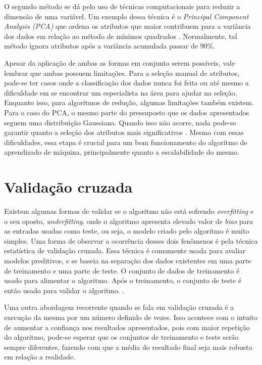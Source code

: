O segundo método se dá pelo uso de técnicas computacionais para reduzir a
dimensão de uma variável. Um exemplo dessa técnica é o \textit{Principal
Component Analysis (PCA) } que ordena os atributos que maior contribuem para a
variância dos dados em relação ao método de mínimos quadrados
\cite{amatriain2011data}. Normalmente, tal método ignora atributos após a
variância acumulada passar de 90\%.

Apesar da aplicação de ambas as formas em conjunto serem possíveis, vale lembrar
que ambas possuem limitações. Para a seleção manual de atributos, pode-se ter
casos onde a classificação dos dados nunca foi feita ou até mesmo a dificuldade
em se encontrar um especialista na área para ajudar na seleção. Enquanto isso,
para algoritmos de redução, algumas limitações também existem. Para o caso do
PCA, o mesmo parte do pressuposto que os dados apresentados seguem uma
distribuição Gaussiana. Quando isso não acorre, nada pode-se garantir quanto a
seleção dos atributos mais significativos \cite{amatriain2011data}. Mesmo com
essas dificuldades, essa etapa é crucial para um bom funcionamento do algoritmo
de aprendizado de máquina, principalmente quanto a escalabilidade do mesmo.


\section{Validação cruzada}\label{subsec:validacao_cruzada}

Existem algumas formas de validar se o algoritmo não está sofrendo \textit{overfitting}
e o seu oposto, \textit{underfitting}, onde o algoritmo apresenta elevado valor
de \textit{bias} para as entradas usadas como teste, ou seja, o modelo criado
pelo algoritmo é muito simples. Uma forma de observar a ocorrência desses dois
fenômenos é pela técnica estatística de validação cruzada. Essa técnica é
comumente usada para avaliar modelos preditivos, e se baseia na separação dos
dados existentes em uma parte de treinamento e uma parte de teste. O conjunto de
dados de treinamento é usado para alimentar o algoritmo. Após o treinamento,
o conjunto de teste é então usado para validar o algoritmo. \cite{araujo2011apprecommender}.

Uma outra abordagem recorrente quando se fala em validação cruzada é a execução
da mesma por um número definido de vezes. Isso acontece com o intuito de
aumentar a confiança nos resultados apresentados, pois com maior repetição do
algoritmo, pode-se esperar que os conjuntos de treinamento e teste serão sempre
diferentes, fazendo com que a média do resultado final seja mais robusta em
relação a realidade.

